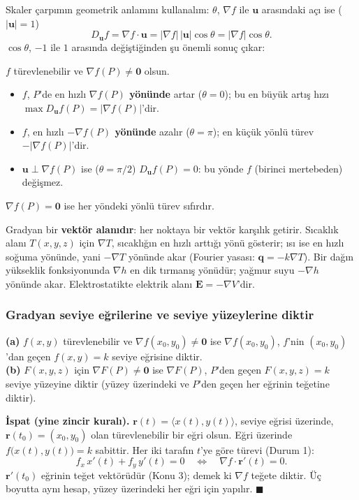 Skaler çarpımın geometrik anlamını kullanalım: $\theta$, $\nabla f$ ile $\mathbf u$ arasındaki açı ise ($|\mathbf u|=1$)
\[
D_{\mathbf u}f=\nabla f\cdot\mathbf u=|\nabla f|\,|\mathbf u|\cos\theta=|\nabla f|\cos\theta .
\]
$\cos\theta$, $-1$ ile $1$ arasında değiştiğinden şu önemli sonuç çıkar:

\begin{teorem}
$f$ türevlenebilir ve $\nabla f(P)\ne\mathbf 0$ olsun.
\begin{itemize}
  \item $f$, $P$'de en hızlı \textbf{$\nabla f(P)$ yönünde} artar ($\theta=0$); bu en büyük artış hızı
        $\max D_{\mathbf u}f(P)=|\nabla f(P)|$'dir.
  \item $f$, en hızlı \textbf{$-\nabla f(P)$ yönünde} azalır ($\theta=\pi$); en küçük yönlü türev $-|\nabla f(P)|$'dir.
  \item $\mathbf u\perp\nabla f(P)$ ise ($\theta=\pi/2$) $D_{\mathbf u}f(P)=0$: bu yönde $f$ (birinci mertebeden) değişmez.
\end{itemize}
$\nabla f(P)=\mathbf 0$ ise her yöndeki yönlü türev sıfırdır.
\end{teorem}

\begin{bilgi}
Gradyan bir \textbf{vektör alanıdır}: her noktaya bir vektör karşılık getirir. Sıcaklık alanı $T(x,y,z)$ için $\nabla T$,
sıcaklığın en hızlı arttığı yönü gösterir; ısı ise en hızlı soğuma yönünde, yani $-\nabla T$ yönünde akar
(Fourier yasası: $\mathbf q=-k\nabla T$). Bir dağın yükseklik fonksiyonunda $\nabla h$ en dik tırmanış yönüdür; yağmur
suyu $-\nabla h$ yönünde akar. Elektrostatikte elektrik alanı $\mathbf E=-\nabla V$'dir.
\end{bilgi}

\subsubsection{Gradyan seviye eğrilerine ve seviye yüzeylerine diktir}

\begin{teorem}[Diklik]
\textbf{(a)} $f(x,y)$ türevlenebilir ve $\nabla f(x_0,y_0)\ne\mathbf 0$ ise $\nabla f(x_0,y_0)$, $f$'nin
$(x_0,y_0)$'dan geçen $f(x,y)=k$ seviye eğrisine diktir.\\
\textbf{(b)} $F(x,y,z)$ için $\nabla F(P)\ne\mathbf 0$ ise $\nabla F(P)$, $P$'den geçen $F(x,y,z)=k$ seviye yüzeyine
diktir (yüzey üzerindeki ve $P$'den geçen her eğrinin teğetine diktir).
\end{teorem}
\textbf{İspat (yine zincir kuralı).} $\mathbf r(t)=\langle x(t),y(t)\rangle$, seviye eğrisi üzerinde, $\mathbf r(t_0)=(x_0,y_0)$
olan türevlenebilir bir eğri olsun. Eğri üzerinde $f\big(x(t),y(t)\big)=k$ sabittir. Her iki tarafın $t$'ye göre türevi
(Durum 1):
\[
f_x\,x'(t)+f_y\,y'(t)=0\quad\Longleftrightarrow\quad \nabla f\cdot\mathbf r'(t)=0 .
\]
$\mathbf r'(t_0)$ eğrinin teğet vektörüdür (Konu 3); demek ki $\nabla f$ teğete diktir. Üç boyutta aynı hesap, yüzey
üzerindeki her eğri için yapılır. $\blacksquare$

